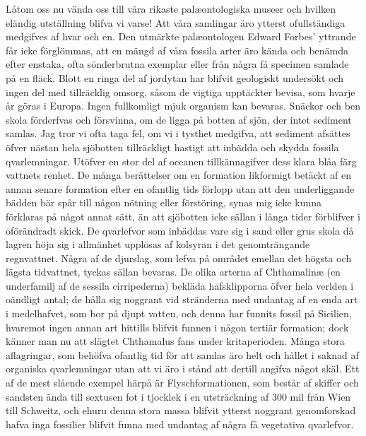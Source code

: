 Låtom oss nu vända oss till våra rikaste palæontologiska museer och hvilken eländig utställning blifva vi varse! Att våra samlingar äro ytterst ofullständiga medgifves af hvar och en. Den utmärkte palæontologen Edward Forbes’ yttrande får icke förglömmas, att en mängd af våra fossila arter äro kända och benämda efter enstaka, ofta sönderbrutna exemplar eller från några få specimen samlade på en fläck. Blott en ringa del af jordytan har blifvit geologiskt undersökt och ingen del med tillräcklig omsorg, såsom de vigtiga upptäckter bevisa, som hvarje år göras i Europa. Ingen fullkomligt mjuk organism kan bevaras. Snäckor och ben skola förderfvas och försvinna, om de ligga på botten af sjön, der intet sediment samlas. Jag tror vi ofta taga fel, om vi i tysthet medgifva, att sediment afsättes öfver nästan hela sjöbotten tillräckligt hastigt att inbädda och skydda fossila qvarlemningar. Utöfver en stor del af oceanen tillkännagifver dess klara blåa färg vattnets renhet. De många berättelser om en formation likformigt betäckt af en annan senare formation efter en ofantlig tids förlopp utan att den underliggande bädden bär spår till någon nötning eller förstöring, synas mig icke kunna förklaras på något annat sätt, än att sjöbotten icke sällan i långa tider förblifver i oförändradt skick. De qvarlefvor som inbäddas vare sig i sand eller grus skola då lagren höja sig i allmänhet upplösas af kolsyran i det genomträngande regnvattnet. Några af de djurslag, som lefva på området emellan det högsta och lägsta tidvattnet, tyckas sällan bevaras. De olika arterna af Chthamalinæ (en underfamilj af de sessila cirripederna) bekläda hafsklipporna öfver hela verlden i oändligt antal; de hålla sig noggrant vid stränderna med undantag af en enda art i medelhafvet, som bor på djupt vatten, och denna har funnits fossil på Sicilien, hvaremot ingen annan art hittills blifvit funnen i någon tertiär formation; dock känner man nu att slägtet Chthamalus fans under kritaperioden. Många stora aflagringar, som behöfva ofantlig tid för att samlas äro helt och hållet i saknad af organiska qvarlemningar utan att vi äro i stånd att dertill angifva något skäl. Ett af de mest slående exempel härpå är Flyschformationen, som består af skiffer och sandsten ända till sextusen fot i tjocklek i en utsträckning af 300 mil från Wien till Schweitz, och ehuru denna stora massa blifvit ytterst noggrant genomforskad hafva inga fossilier blifvit funna med undantag af några få vegetativa qvarlefvor.

